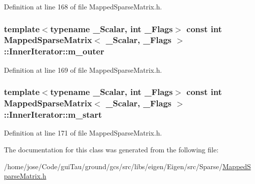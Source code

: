 Definition at line 168 of file Mapped\-Sparse\-Matrix.\-h.

\hypertarget{class_mapped_sparse_matrix_1_1_inner_iterator_a4b0d95329bd5a88ba6b5c84126ed2c15}{
\subsubsection[{m\-\_\-outer}]{\setlength{\rightskip}{0pt plus 5cm}template$<$typename \-\_\-\-Scalar, int \-\_\-\-Flags$>$ const {\bf int} {\bf Mapped\-Sparse\-Matrix}$<$ \-\_\-\-Scalar, \-\_\-\-Flags $>$\-::Inner\-Iterator\-::m\-\_\-outer\hspace{0.3cm}{\ttfamily [protected]}}}\label{class_mapped_sparse_matrix_1_1_inner_iterator_a4b0d95329bd5a88ba6b5c84126ed2c15}


Definition at line 169 of file Mapped\-Sparse\-Matrix.\-h.

\hypertarget{class_mapped_sparse_matrix_1_1_inner_iterator_a03b2d3eed69004d889c8e35ff0521402}{
\subsubsection[{m\-\_\-start}]{\setlength{\rightskip}{0pt plus 5cm}template$<$typename \-\_\-\-Scalar, int \-\_\-\-Flags$>$ const {\bf int} {\bf Mapped\-Sparse\-Matrix}$<$ \-\_\-\-Scalar, \-\_\-\-Flags $>$\-::Inner\-Iterator\-::m\-\_\-start\hspace{0.3cm}{\ttfamily [protected]}}}\label{class_mapped_sparse_matrix_1_1_inner_iterator_a03b2d3eed69004d889c8e35ff0521402}


Definition at line 171 of file Mapped\-Sparse\-Matrix.\-h.



The documentation for this class was generated from the following file\-:\begin{DoxyCompactItemize}
\item 
/home/jose/\-Code/gui\-Tau/ground/gcs/src/libs/eigen/\-Eigen/src/\-Sparse/\hyperlink{_mapped_sparse_matrix_8h}{Mapped\-Sparse\-Matrix.\-h}\end{DoxyCompactItemize}
